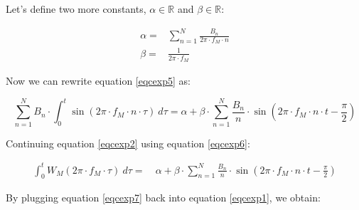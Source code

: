 \documentclass{article}
\begin{document}
    Let's define two more constants, $\alpha \in \mathbb{R}$ and
    $\beta \in \mathbb{R}$:

    \begin{equation}
      \begin{split}
        \alpha = & \sum_{n=1}^{N} \frac{B_n}{2\pi \cdot f_M \cdot n} \\
        \beta = & \frac{1}{2\pi \cdot f_M}
      \end{split}
    \end{equation}

    Now we can rewrite equation \ref{eqcexp5} as:

    \begin{equation}\label{eqcexp6}
      \sum_{n=1}^{N}
        B_n
        \cdot \int_{0}^{t} \sin(2\pi \cdot f_M \cdot n \cdot \tau) \ d\tau
          = \alpha
            + \beta
            \cdot \sum_{n=1}^{N}
              \frac{B_n}{n} \cdot \sin \left(
                2\pi \cdot f_M \cdot n \cdot t - \frac{\pi}{2}
              \right)
    \end{equation}

    Continuing equation \ref{eqcexp2} using equation \ref{eqcexp6}:

    \begin{equation}\label{eqcexp7}
      \begin{split}
        \int_{0}^{t} W_M(2\pi \cdot f_M \cdot \tau) \ d\tau
          = & \ \alpha
              + \beta \cdot \sum_{n=1}^{N}
                  \frac{B_n}{n} \cdot \sin \left(
                    2\pi \cdot f_M \cdot n \cdot t - \frac{\pi}{2}
                  \right)
      \end{split}
    \end{equation}

    By plugging equation \ref{eqcexp7} back into equation \ref{eqcexp1}, we
    obtain:
\end{document}
